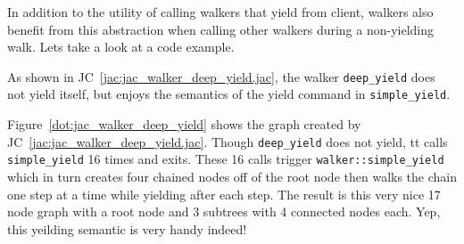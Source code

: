 In addition to the utility of calling walkers that yield from client, walkers also benefit from this abstraction when calling other walkers during a non-yielding walk. Lets take a look at a code example.
\par
{}
\par
{}
As shown in JC~\ref{jac:jac_walker_deep_yield.jac}, the walker \lstinline{deep_yield} does not yield itself, but enjoys the semantics of the yield command in \lstinline{simple_yield}.
\par
Figure~\ref{dot:jac_walker_deep_yield} shows the graph created by JC~\ref{jac:jac_walker_deep_yield.jac}. Though \lstinline{deep_yield} does not yield, tt calls \lstinline{simple_yield} 16 times and exits. These 16 calls trigger \lstinline{walker::simple_yield} which in turn creates four chained nodes off of the root node then walks the chain one step at a time while yielding after each step. The result is this very nice 17 node graph with a root node and 3 subtrees with 4 connected nodes each. Yep, this yeilding semantic is very handy indeed!